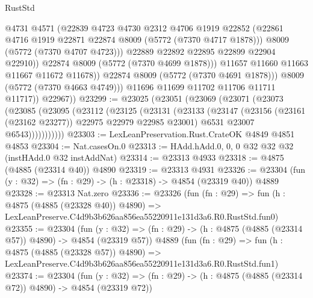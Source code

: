 \begin{lexlean}{RustStd}
\begin{coremodule}
                          @4731
                          @4571
                          (@22839
                            @4723
                            @4730
                            @2312
                            @4706
                            @1919
                            @22852
                            (@22861 @4716 @1919 @22871 @22874 @8009 (@5772 (@7370 @4717 @1878)))
                            @8009
                            (@5772 (@7370 @4707 @4723)))
                          @22889
                          @22892
                          @22895
                          @22899
                          @22904
                          @22910))
                      @22874
                      @8009
                      (@5772 (@7370 @4699 @1878)))
                    @11657
                    @11660
                    @11663
                    @11667
                    @11672
                    @11678))
                @22874
                @8009
                (@5772 (@7370 @4691 @1878)))
              @8009
              (@5772 (@7370 @4663 @4749)))
            @11696
            @11699
            @11702
            @11706
            @11711
            @11717))
        @22967))
@23299 := @23025
    (@23051
      (@23069
        (@23071
          (@23073
            (@23085
              (@23095
                (@23112
                  (@23125
                    (@23131
                      (@23133
                        (@23147
                          (@23156 (@23161 (@23162 @23277)) @22975 @22979 @22985 @23001)
                          @6531
                          @23007
                          @6543)))))))))))
@23303 := LexLeanPreservation.Rust.CrateOK @4849 @4851 @4853
@23304 := Nat.casesOn.{0}
@23313 := HAdd.hAdd.{0, 0, 0} @32 @32 @32 (instHAdd.{0} @32 instAddNat)
@23314 := @23313 @4933
@23318 := @4875 (@4885 (@23314 @40)) @4890
@23319 := @23313 @4931
@23326 := @23304 (fun (y : @32) => (fn : @29) -> (h : @23318) -> @4854 (@23319 @40)) @4889
@23328 := @23313 Nat.zero
@23336 := @23326
    (fun (fn : @29) =>
    fun (h : @4875 (@4885 (@23328 @40)) @4890) =>
    LexLeanPreserve.C4d9b3b626aa856ea55220911e131d3a6.R0.RustStd.fun0)
@23355 := @23304
    (fun (y : @32) => (fn : @29) -> (h : @4875 (@4885 (@23314 @57)) @4890) -> @4854 (@23319 @57))
    @4889
    (fun (fn : @29) =>
    fun (h : @4875 (@4885 (@23328 @57)) @4890) =>
    LexLeanPreserve.C4d9b3b626aa856ea55220911e131d3a6.R0.RustStd.fun1)
@23374 := @23304
    (fun (y : @32) => (fn : @29) -> (h : @4875 (@4885 (@23314 @72)) @4890) -> @4854 (@23319 @72))

\end{coremodule}
\end{lexlean}
